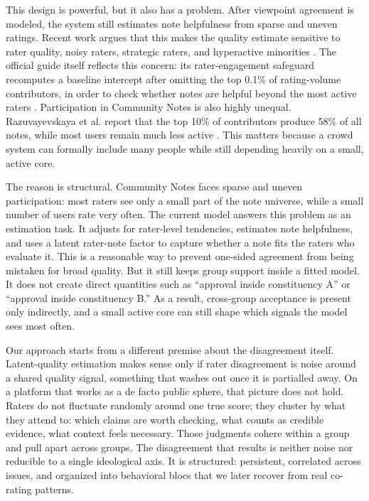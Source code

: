 \documentclass[10pt,twocolumn]{article}
\begin{document}
This design is powerful, but it also has a problem. After viewpoint agreement
is modeled, the system still estimates note helpfulness from sparse and uneven
ratings. Recent work argues that this makes the quality estimate sensitive to
rater quality, noisy raters, strategic raters, and hyperactive minorities
\citep{goyal2026qsmf,nudo2026hyperactive}. The official guide itself reflects
this concern: its rater-engagement safeguard recomputes a baseline intercept
after omitting the top 0.1\% of rating-volume contributors, in order to check
whether notes are helpful beyond the most active raters
\citep{xcommunitynotes2026ranking}. Participation in Community Notes is also
highly unequal. Razuvayevskaya et al. report that the top 10\% of contributors
produce 58\% of all notes, while most users remain much less active
\citep{razuvayevskaya2025timeliness}. This matters because a crowd system can
formally include many people while still depending heavily on a small, active
core.

The reason is structural. Community Notes faces sparse and uneven
participation: most raters see only a small part of the note universe, while a
small number of users rate very often. The current model answers this problem
as an estimation task. It adjusts for rater-level tendencies, estimates note
helpfulness, and uses a latent rater-note factor to capture whether a note fits
the raters who evaluate it. This is a reasonable way to prevent one-sided
agreement from being mistaken for broad quality. But it still keeps group
support inside a fitted model. It does not create direct quantities such as
``approval inside constituency A'' or ``approval inside constituency B.'' As a
result, cross-group acceptance is present only indirectly, and a small active
core can still shape which signals the model sees most often.

Our approach starts from a different premise about the disagreement itself.
Latent-quality estimation makes sense only if rater disagreement is noise around
a shared quality signal, something that washes out once it is partialled away.
On a platform that works as a de facto public sphere, that picture does not
hold. Raters do not fluctuate randomly around one true score; they cluster by
what they attend to: which claims are worth checking, what counts as credible
evidence, what context feels necessary. Those judgments cohere within a
group and pull apart across groups. The disagreement that results is neither
noise nor reducible to a single ideological axis. It is structured: persistent,
correlated across issues, and organized into behavioral blocs that we later
recover from real co-rating patterns.
\end{document}
